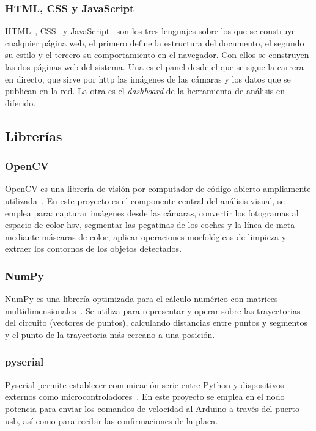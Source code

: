 \subsubsection{HTML, CSS y JavaScript}

HTML~\cite{html}, CSS~\cite{css} y JavaScript~\cite{ecmascript} son los tres lenguajes sobre los que se construye cualquier página web, el primero define la estructura del documento, el segundo su estilo y el tercero su comportamiento en el navegador. Con ellos se construyen las dos páginas web del sistema. Una es el panel desde el que se sigue la carrera en directo, que sirve por \gls{http} las imágenes de las cámaras y los datos que se publican en la red. La otra es el \emph{dashboard} de la herramienta de análisis en diferido.

\subsection{Librerías}
\subsubsection{OpenCV}
OpenCV es una librería de visión por computador de código abierto ampliamente utilizada~\cite{opencv,bradski2008}. En este proyecto es el componente central del análisis visual, se emplea para: capturar imágenes desde las cámaras, convertir los fotogramas al espacio de color \gls{hsv}, segmentar las pegatinas de los coches y la línea de meta mediante máscaras de color, aplicar operaciones morfológicas de limpieza y extraer los contornos de los objetos detectados.
\subsubsection{NumPy}
NumPy es una librería optimizada para el cálculo numérico con matrices multidimensionales~\cite{numpy}. Se utiliza para representar y operar sobre las trayectorias del circuito (vectores de puntos), calculando distancias entre puntos y segmentos y el punto de la trayectoria más cercano a una posición. %

\subsubsection{pyserial}
Pyserial permite establecer comunicación serie entre Python y dispositivos externos como microcontroladores~\cite{pyserial}. En este proyecto se emplea en el nodo potencia para enviar los comandos de velocidad al Arduino a través del puerto \gls{usb}, así como para recibir las confirmaciones de la placa.

